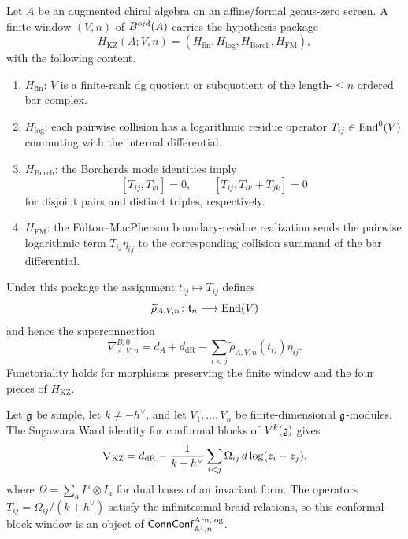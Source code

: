\begin{construction}
\label{constr:kz-functor-platonic}
Let $A$ be an augmented chiral algebra on an affine/formal genus-zero
screen.  A finite window $(V,n)$ of $B^{\mathrm{ord}}(A)$ carries the
hypothesis package
\[
H_{\mathrm{KZ}}(A;V,n)
=(H_{\mathrm{fin}},H_{\log},H_{\mathrm{Borch}},H_{\mathrm{FM}}),
\]
with the following content.
\begin{enumerate}[label=\textup{(K\arabic*)}]
\item $H_{\mathrm{fin}}$: $V$ is a finite-rank dg quotient or
subquotient of the length-$\leq n$ ordered bar complex.
\item $H_{\log}$: each pairwise collision has a logarithmic residue
operator $T_{ij}\in\mathrm{End}^0(V)$ commuting with the internal differential.
\item $H_{\mathrm{Borch}}$: the Borcherds mode identities imply
\[
[T_{ij},T_{kl}]=0,
\qquad
[T_{ij},T_{ik}+T_{jk}]=0
\]
for disjoint pairs and distinct triples, respectively.
\item $H_{\mathrm{FM}}$: the Fulton--MacPherson boundary-residue
realization sends the pairwise logarithmic term
$T_{ij}\eta_{ij}$ to the corresponding collision summand of the bar
differential.
\end{enumerate}
Under this package the assignment $t_{ij}\mapsto T_{ij}$ defines
\begin{equation}
\label{eq:r-matrix-from-ope}
 \widetilde\rho_{A,V,n}\colon\mathfrak t_n\longrightarrow\mathrm{End}(V)
\end{equation}
and hence the superconnection
\begin{equation}
\label{eq:nabla-of-A}
 \nabla^{B,0}_{A,V,n}
 =d_A+d_{\mathrm{dR}}
 -\sum_{i<j}\widetilde\rho_{A,V,n}(t_{ij})\eta_{ij}.
\end{equation}
Functoriality holds for morphisms preserving the finite window and the
four pieces of $H_{\mathrm{KZ}}$.
\end{construction}

\begin{computation}
\label{ex:kz-of-vk-g-platonic}
Let $\mathfrak{g}$ be simple, let $k\neq-h^\vee$, and let
$V_1,\ldots,V_n$ be finite-dimensional $\mathfrak{g}$-modules.  The Sugawara
Ward identity for conformal blocks of $V^k(\mathfrak{g})$ gives
\begin{equation}
\label{eq:r-kz-form-vk-g}
 \nabla_{\mathrm{KZ}}
 =d_{\mathrm{dR}}-\frac{1}{k+h^\vee}
 \sum_{i<j}\Omega_{ij}\,d\log(z_i-z_j),
\end{equation}
where $\Omega=\sum_a I^a\otimes I_a$ for dual bases of an invariant
form.  The operators
$T_{ij}=\Omega_{ij}/(k+h^\vee)$ satisfy the infinitesimal braid
relations, so this conformal-block window is an object of
$\mathsf{ConnConf}^{\mathrm{Arn,log}}_{\mathbb A^1,n}$.
\end{computation}

